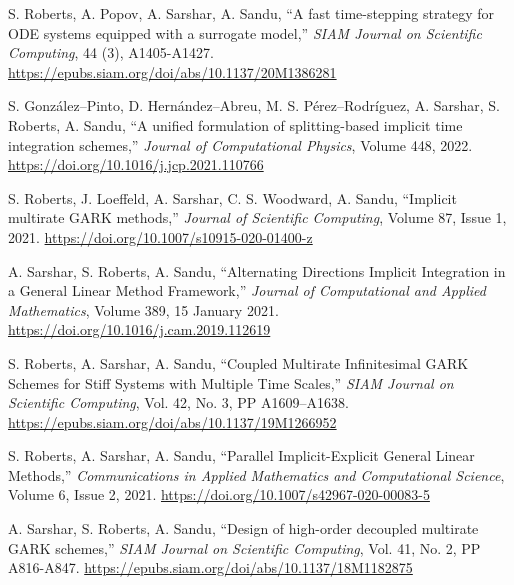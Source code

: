 \documentclass[11pt,letterpaper]{report}
\newcommand{\paperinfo}[5]{
    \tab{}
    #1, %
    \enquote{#2,} %
    \textit{#3}, %
    #4. %
    \href{#5}{#5} %
}
\begin{document}
\begin{tablist}
    \item[2022] \paperinfo{S. Roberts, A. Popov, A. Sarshar, A. Sandu}
        {A fast time-stepping strategy for ODE systems equipped with a surrogate model}
        {SIAM Journal on Scientific Computing}{44 (3), A1405-A1427}
        {https://epubs.siam.org/doi/abs/10.1137/20M1386281}

    \item[2022] \paperinfo{S. González--Pinto, D. Hernández--Abreu, M. S. Pérez--Rodríguez, A. Sarshar, S. Roberts, A. Sandu}
        {A unified formulation of splitting-based implicit time integration schemes}
        {Journal of Computational Physics}{Volume 448, 2022}
        {https://doi.org/10.1016/j.jcp.2021.110766}

    \item[2021] \paperinfo{S. Roberts, J. Loeffeld, A. Sarshar, C. S. Woodward, A. Sandu}
        {Implicit multirate GARK methods}
        {Journal of Scientific Computing}{Volume 87, Issue 1, 2021}
        {https://doi.org/10.1007/s10915-020-01400-z}

    \item[2021] \paperinfo{A. Sarshar, S. Roberts, A. Sandu}
        {Alternating Directions Implicit Integration in a General Linear Method Framework}
        {Journal of Computational and Applied Mathematics}{Volume 389, 15 January 2021}
        {https://doi.org/10.1016/j.cam.2019.112619}

    \item[2020] \paperinfo{S. Roberts, A. Sarshar, A. Sandu}
        {Coupled Multirate Infinitesimal GARK Schemes for Stiff Systems with Multiple Time Scales}
        {SIAM Journal on Scientific Computing}{Vol. 42, No. 3, PP A1609–A1638}
        {https://epubs.siam.org/doi/abs/10.1137/19M1266952}

    \item[2020] \paperinfo{S. Roberts, A. Sarshar, A. Sandu}
        {Parallel Implicit-Explicit General Linear Methods}
        {Communications in Applied Mathematics and Computational Science}{Volume 6, Issue 2, 2021}
        {https://doi.org/10.1007/s42967-020-00083-5}

    \item[2019] \paperinfo{A. Sarshar, S. Roberts, A. Sandu}
        {Design of high-order decoupled multirate GARK schemes}
        {SIAM Journal on Scientific Computing}{Vol. 41, No. 2, PP A816-A847}
        {https://epubs.siam.org/doi/abs/10.1137/18M1182875}


\end{tablist}
\end{document}
